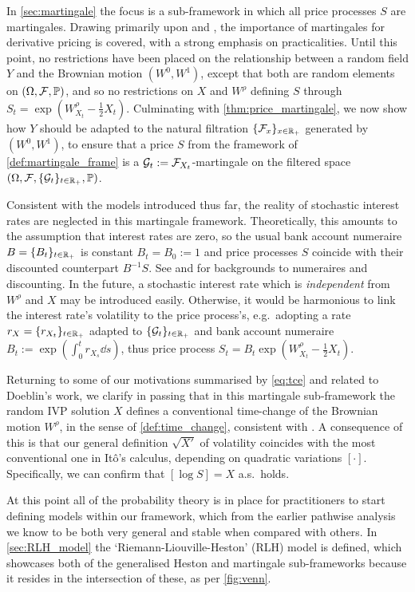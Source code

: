 In \autoref{sec:martingale} the focus is a sub-framework in which all price processes $S$ are martingales. Drawing primarily upon \cite{cont_2003} and \cite{guyon_2013}, the importance of martingales for derivative pricing is covered, with a strong emphasis on practicalities. Until this point, no restrictions have been placed on the relationship between a random field $Y$ and the Brownian motion $(W^0,W^1)$, except that both are random elements on $(\Omega,\mathcal{F},\mathbb{P})$, and so no restrictions on $X$ and $W^\rho$ defining $S$ through $S_t = \exp\left(W^\rho_{X_t} - \tfrac12 X_t\right)$. Culminating with \autoref{thm:price_martingale}, we now show how $Y$ should be adapted to the natural filtration $\{\mathcal{F}_x\}_{x\in\mathbb{R}_+}$ generated by $(W^0,W^1)$, to ensure that a price $S$ from the framework of \autoref{def:martingale_frame} is a $\mathcal{G}_t:=\mathcal{F}_{X_t}$-martingale on the filtered space $(\Omega,\mathcal{F},\{\mathcal{G}_t\}_{t\in\mathbb{R}_+},\mathbb{P})$.

Consistent with the models introduced thus far, the reality of stochastic interest rates are neglected in this martingale framework. Theoretically, this amounts to the assumption that interest rates are zero, so the usual bank account numeraire $B=\{B_t\}_{t\in\mathbb{R}_+}$ is constant $B_t=B_0:=1$ and price processes $S$ coincide with their discounted counterpart $B^{-1}S$. See \cite{brigo_2006} and \cite{andersen_2010} for backgrounds to numeraires and discounting. In the future, a stochastic interest rate which is \emph{independent} from $W^\rho$ and $X$ may be introduced easily. Otherwise, it would be harmonious to link the interest rate's volatility to the price process's, e.g.~adopting a rate $r_X=\{r_{X_t}\}_{t\in\mathbb{R}_+}$ adapted to $\{\mathcal{G}_t\}_{t\in\mathbb{R}_+}$ and bank account numeraire $B_t:=\exp(\int_0^t r_{X_s}\dd s)$, thus price process $S_t = B_t\exp(W^\rho_{X_t} - \tfrac12 X_t)$.

Returning to some of our motivations summarised by \autoref{eq:tce} and related to Doeblin's work, we clarify in passing that in this martingale sub-framework the random IVP solution $X$ defines a conventional time-change of the Brownian motion $W^\rho$, in the sense of \autoref{def:time_change}, consistent with \cite{revuz_1999}. A consequence of this is that our general definition $\sqrt{X'}$ of volatility coincides with the most conventional one in It\^o's calculus, depending on quadratic variations $[\cdot]$. Specifically, we can confirm that $[\log S]=X$ a.s.~holds.

At this point all of the probability theory is in place for practitioners to start defining models within our framework, which from the earlier pathwise analysis we know to be both very general and stable when compared with others. In \autoref{sec:RLH_model} the `Riemann-Liouville-Heston' (RLH) model is defined, which showcases both of the generalised Heston and martingale sub-frameworks because it resides in the intersection of these, as per \autoref{fig:venn}.

